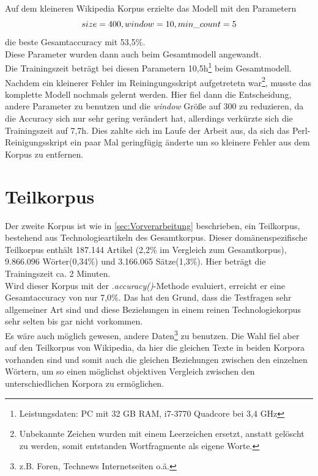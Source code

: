 \documentclass[12pt,a4paper]{report}
\begin{document}
Auf dem kleineren Wikipedia Korpus erzielte das Modell mit den Parametern 
$$\\size = 400, window = 10, min\_count = 5$$
 die beste Gesamtaccuracy mit 53,5\%.\\
Diese Parameter wurden dann auch beim Gesamtmodell angewandt.\\
Die Trainingszeit beträgt bei diesen Parametern 10,5h\footnote{Leistungsdaten: PC mit 32 GB RAM, i7-3770 Quadcore bei 3,4 GHz} beim Gesamtmodell.\\
Nachdem ein kleinerer Fehler im Reiningungsskript aufgetretetn war\footnote{Unbekannte Zeichen wurden mit einem Leerzeichen ersetzt, anstatt gelöscht zu werden, somit entstanden Wortfragmente als eigene Worte.}, musste das komplette Modell nochmals gelernt werden. Hier fiel dann die Entscheidung, andere Parameter zu benutzen und die \textit{window} Größe auf 300 zu reduzieren, da die Accuracy sich nur sehr gering verändert hat, allerdings verkürzte sich die Trainingszeit auf 7,7h. Dies zahlte sich im Laufe der Arbeit aus, da sich das Perl-Reinigungsskript ein paar Mal geringfügig änderte um so kleinere Fehler aus dem Korpus zu entfernen.\\


	
	\section{Teilkorpus}
	\label{sec:Teilkorpus}	
	Der zweite Korpus ist wie in \ref{sec:Vorverarbeitung} beschrieben, ein Teilkorpus, bestehend aus Technologieartikeln des Gesamtkorpus. Dieser domänenspezifische Teilkorpus enthält 187.144 Artikel (2,2\% im Vergleich zum Gesamtkorpus), 9.866.096 Wörter(0,34\%) und 3.166.065 Sätze(1,3\%). Hier beträgt die Trainingszeit ca. 2 Minuten.\\
	Wird dieser Korpus mit der \textit{.accuracy()}-Methode evaluiert, erreicht er eine Gesamtaccuracy von nur 7,0\%. Das hat den Grund, dass die Testfragen sehr allgemeiner Art sind und diese Beziehungen in einem reinen Technologiekorpus sehr selten bis gar nicht vorkommen.\\
	
	Es wäre auch möglich gewesen, andere Daten\footnote{z.B. Foren, Technews Internetseiten o.ä.} zu benutzen. Die Wahl fiel aber auf den Teilkorpus von Wikipedia, da hier die gleichen Texte in beiden Korpora vorhanden sind und somit auch die gleichen Beziehungen zwischen den einzelnen Wörtern, um so einen möglichst objektiven Vergleich zwischen den unterschiedlichen Korpora zu ermöglichen.\\
	
\end{document}

